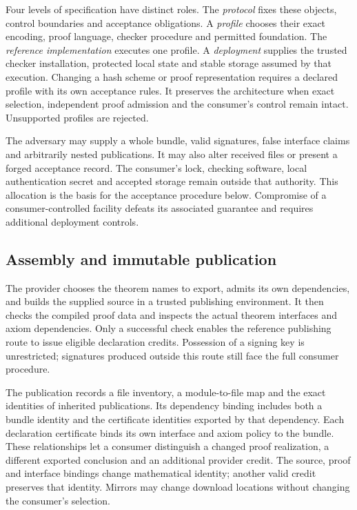 \documentclass[11pt]{article}
\begin{document}
Four levels of specification have distinct roles. The \emph{protocol} fixes
these objects, control boundaries and acceptance obligations. A \emph{profile}
chooses their exact encoding, proof language, checker procedure and permitted
foundation. The \emph{reference implementation} executes one profile. A
\emph{deployment} supplies the trusted checker installation, protected local
state and stable storage assumed by that execution. Changing a hash scheme
or proof representation requires a declared profile with its own acceptance
rules. It preserves the architecture when exact selection, independent proof
admission and the consumer's control remain intact. Unsupported profiles are rejected.

The adversary may supply a whole bundle, valid signatures, false interface
claims and arbitrarily nested publications. It may also alter received files
or present a forged acceptance record. The consumer's lock, checking software,
local authentication secret and accepted storage remain outside that authority.
This allocation is the basis for the acceptance procedure below. Compromise of
a consumer-controlled facility defeats its associated guarantee and requires
additional deployment controls.

\subsection{Assembly and immutable publication}

The provider chooses the theorem names to export, admits its own dependencies,
and builds the supplied source in a trusted publishing environment. It then
checks the compiled proof data and inspects the actual theorem interfaces and
axiom dependencies. Only a successful check enables the reference publishing
route to issue eligible declaration credits. Possession of a signing key is
unrestricted; signatures produced outside this route still face the full
consumer procedure.

The publication records a file inventory, a module-to-file map and the exact
identities of inherited publications. Its dependency binding includes both a
bundle identity and the certificate identities exported by that dependency.
Each declaration certificate binds its own interface and axiom policy to the
bundle. These relationships let a consumer distinguish a changed proof
realization, a different exported conclusion and an additional provider credit.
The source, proof and interface bindings change mathematical identity; another
valid credit preserves that identity. Mirrors may change download locations
without changing the consumer's selection.
\end{document}
